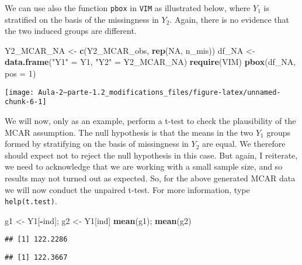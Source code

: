\documentclass[
]{article}
\newenvironment{Shaded}{\begin{snugshade}}{\end{snugshade}}
\newcommand{\AttributeTok}[1]{\textcolor[rgb]{0.13,0.29,0.53}{#1}}
\newcommand{\ConstantTok}[1]{\textcolor[rgb]{0.56,0.35,0.01}{#1}}
\newcommand{\DecValTok}[1]{\textcolor[rgb]{0.00,0.00,0.81}{#1}}
\newcommand{\FunctionTok}[1]{\textcolor[rgb]{0.13,0.29,0.53}{\textbf{#1}}}
\newcommand{\NormalTok}[1]{#1}
\newcommand{\OtherTok}[1]{\textcolor[rgb]{0.56,0.35,0.01}{#1}}
\newcommand{\SpecialCharTok}[1]{\textcolor[rgb]{0.81,0.36,0.00}{\textbf{#1}}}
\newcommand{\StringTok}[1]{\textcolor[rgb]{0.31,0.60,0.02}{#1}}
\begin{document}
We can use also the function \texttt{pbox} in \texttt{VIM} as
illustrated below, where \(Y_1\) is stratified on the basis of the
missingness in \(Y_2\). Again, there is no evidence that the two induced
groups are different.

\begin{Shaded}
\begin{Highlighting}[]
\NormalTok{Y2\_MCAR\_NA }\OtherTok{\textless{}{-}} \FunctionTok{c}\NormalTok{(Y2\_MCAR\_obs, }\FunctionTok{rep}\NormalTok{(}\ConstantTok{NA}\NormalTok{, n\_mis))}
\NormalTok{df\_NA }\OtherTok{\textless{}{-}} \FunctionTok{data.frame}\NormalTok{(}\StringTok{"Y1"} \OtherTok{=}\NormalTok{ Y1, }\StringTok{"Y2"} \OtherTok{=}\NormalTok{ Y2\_MCAR\_NA)}
\FunctionTok{require}\NormalTok{(VIM)}
\FunctionTok{pbox}\NormalTok{(df\_NA, }\AttributeTok{pos =} \DecValTok{1}\NormalTok{)}
\end{Highlighting}
\end{Shaded}

\begin{center}\texttt{[image: Aula-2---parte-1.2\_modifications\_files/figure-latex/unnamed-chunk-6-1]} \end{center}

We will now, only as an example, perform a t-test to check the
plausibility of the MCAR assumption. The null hypothesis is that the
means in the two \(Y_1\) groups formed by stratifying on the basis of
missingness in \(Y_2\) are equal. We therefore should expect not to
reject the null hypothesis in this case. But again, I reiterate, we need
to acknowledge that we are working with a small sample size, and so
results may not turned out as expected. So, for the above generated MCAR
data we will now conduct the unpaired t-test. For more information, type
\texttt{help(t.test)}.

\begin{Shaded}
\begin{Highlighting}[]
\NormalTok{g1 }\OtherTok{\textless{}{-}}\NormalTok{ Y1[}\SpecialCharTok{{-}}\NormalTok{ind]; g2 }\OtherTok{\textless{}{-}}\NormalTok{ Y1[ind]}
\FunctionTok{mean}\NormalTok{(g1); }\FunctionTok{mean}\NormalTok{(g2)}
\end{Highlighting}
\end{Shaded}

\begin{verbatim}
## [1] 122.2286
\end{verbatim}

\begin{verbatim}
## [1] 122.3667
\end{verbatim}
\end{document}

